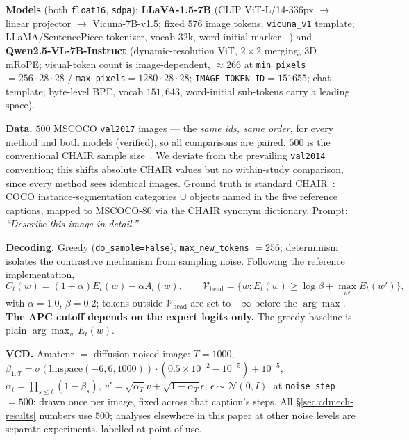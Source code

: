 \textbf{Models} (both \texttt{float16}, \texttt{sdpa}): \textbf{LLaVA-1.5-7B}
(CLIP ViT-L/14-336px $\to$ linear projector $\to$ Vicuna-7B-v1.5; fixed $576$
image tokens; \texttt{vicuna\_v1} template; LLaMA/SentencePiece tokenizer, vocab
$32$k, word-initial marker \texttt{\_}) and \textbf{Qwen2.5-VL-7B-Instruct}
(dynamic-resolution ViT, $2\times2$ merging, 3D mRoPE; visual-token count is
image-dependent, $\approx266$ at \texttt{min\_pixels}$=256\cdot28\cdot28$ /
\texttt{max\_pixels}$=1280\cdot28\cdot28$; \texttt{IMAGE\_TOKEN\_ID}$=151655$;
chat template; byte-level BPE, vocab $151{,}643$, word-initial sub-tokens carry
a leading space).

\textbf{Data.} $500$ MSCOCO \texttt{val2017} images --- the \emph{same ids, same
order}, for every method and both models (verified), so all comparisons are
paired. $500$ is the conventional CHAIR sample size~\citep{huang2024opera}. We
deviate from the prevailing \texttt{val2014} convention; this shifts absolute
CHAIR values but no within-study comparison, since every method sees identical
images. Ground truth is standard CHAIR~\citep{rohrbach2018chair}: COCO
instance-segmentation categories $\cup$ objects named in the five reference
captions, mapped to MSCOCO-80 via the CHAIR synonym dictionary. Prompt:
\emph{``Describe this image in detail.''}

\textbf{Decoding.} Greedy (\texttt{do\_sample=False}), \texttt{max\_new\_tokens}
$=256$; determinism isolates the contrastive mechanism from sampling noise.
Following the reference implementation,
\begin{equation}
  C_t(w) = (1+\alpha)E_t(w) - \alpha A_t(w),
  \qquad
  \mathcal{V}_{\text{head}} = \big\{ w : E_t(w) \ge \log\beta + \max_{w'} E_t(w') \big\},
\end{equation}
with $\alpha=1.0$, $\beta=0.2$; tokens outside $\mathcal{V}_{\text{head}}$ are
set to $-\infty$ before the $\arg\max$. \textbf{The APC cutoff depends on the
expert logits only.} The greedy baseline is plain $\arg\max_w E_t(w)$.

\textbf{VCD.} Amateur $=$ diffusion-noised image: $T=1000$,
$\beta_{1:T}=\sigma(\mathrm{linspace}(-6,6,1000))\cdot(0.5\!\times\!10^{-2}-10^{-5})+10^{-5}$,
$\bar\alpha_t=\prod_{s\le t}(1-\beta_s)$,
$v'=\sqrt{\bar\alpha_T}v+\sqrt{1-\bar\alpha_T}\epsilon$, $\epsilon\sim\mathcal{N}(0,I)$,
at \texttt{noise\_step}$=500$; drawn once per image, fixed across that caption's
steps. All \S\ref{sec:cdmech-results} numbers use $500$; analyses elsewhere in this
paper at other noise levels are separate experiments, labelled at point of use.

